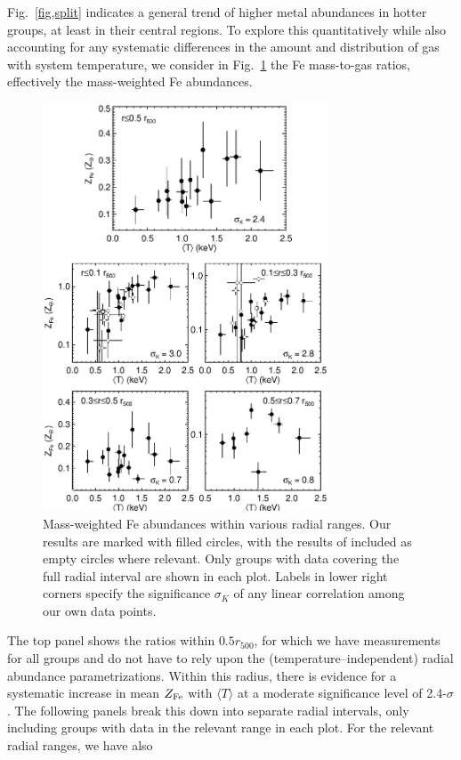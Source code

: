 \documentclass[useAMS,usenatbib]{mn2e}
\begin{document}
Fig.~\ref{fig,split} indicates a general trend of higher metal
abundances in hotter groups, at least in their central regions. To
explore this quantitatively while also accounting for any systematic
differences in the amount and distribution of gas with system
temperature, we consider in Fig.~\ref{fig,ZT} the Fe mass-to-gas
ratios, effectively the mass-weighted Fe abundances.
\begin{figure} 
\hspace{-1mm}
  \includegraphics[width=85mm]{fig10.eps}
\caption{Mass-weighted Fe abundances within various radial ranges. Our
  results are marked with filled circles, with the results of
  \citet{fino06,fino07} included as empty circles where relevant. Only
  groups with data covering the full radial interval are shown in each
  plot. Labels in lower right corners specify the significance
  $\sigma_K$ of any linear correlation among our own data points.}
\label{fig,ZT} 
\end{figure} 
The top panel shows the ratios within $0.5r_{500}$, for which we have
measurements for all groups and do not have to rely upon the
(temperature--independent) radial abundance parametrizations.  Within
this radius, there is evidence for a systematic increase in mean
$Z_{\rm Fe}$ with $\langle T\rangle$ at a moderate significance level
of 2.4-$\sigma$.  The following panels break this down into separate
radial intervals, only including groups with data in the relevant
range in each plot. For the relevant radial ranges, we have also
\end{document}

